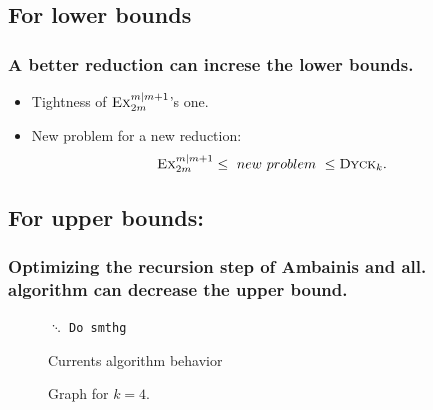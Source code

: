 \documentclass[9pt, notheorems]{beamer}
\newcommand{\Dyck}[1]{\textsc{Dyck$_{#1}$}}
\theoremstyle{definition}
\theoremstyle{plain}
\theoremstyle{definition}
\begin{document}
\subsection{For lower bounds}
\begin{frame}
    \frametitle{A better reduction can increse the lower bounds.}
    \begin{itemize}
        \item Tightness of $\textsc{Ex}_{2m}^{m|m+1}$'s one.
        \item New problem for a new reduction:
              \[\textsc{Ex}_{2m}^{m|m+1} \leq\ new\ problem\ \leq \Dyck{k}.\]
    \end{itemize}
\end{frame}

\subsection{For upper bounds:}
\begin{frame}
    \frametitle{Optimizing the recursion step of Ambainis and all. algorithm can decrease the upper bound.}
    \begin{minipage}{.45\textwidth}
        \begin{figure}
            \begin{algorithmic}
                \State $\ddots$
                \State \texttt{Do smthg}
                \EndFor
                \EndFor
                \EndFor
            \end{algorithmic}
            \caption{Currents algorithm behavior}
        \end{figure}
    \end{minipage}
    \hfill
    \begin{minipage}{.45\textwidth}
        \begin{figure}
            \caption{Graph for $k=4$.}
        \end{figure}
    \end{minipage}
\end{frame}
\end{document}
